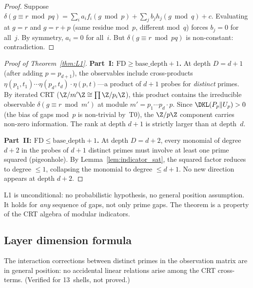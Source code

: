 \documentclass[12pt,a4paper]{article}
\begin{document}
\begin{proof}
Suppose $\delta(g \equiv r \bmod pq) = \sum_i a_i f_i(g \bmod p) + \sum_j b_j
h_j(g \bmod q) + c$.  Evaluating at $g = r$ and $g = r + p$ (same residue
mod~$p$, different mod~$q$) forces $b_j = 0$ for all~$j$.  By symmetry,
$a_i = 0$ for all~$i$.  But $\delta(g \equiv r \bmod pq)$ is non-constant:
contradiction.
\end{proof}

\begin{proof}[Proof of Theorem~\ref{thm:L1}]
\textbf{Part~I: $\mathrm{FD} \ge \mathrm{base\_depth} + 1$.}\quad
At depth $D = d{+}1$ (after adding $p = p_{d+1}$), the observables include
cross-products $\eta(p_1, t_1) \cdots \eta(p_d, t_d) \cdot \eta(p, t)$---a
product of $d{+}1$ probes for \emph{distinct} primes.  By iterated CRT
($\Z/m'\Z \cong \prod \Z/p_i\Z$), this product contains the irreducible
observable $\delta(g \equiv r \bmod m')$ at module
$m' = p_1 \cdots p_d \cdot p$.  Since $\DKL(P_p \| U_p) > 0$ (the bias of
gaps mod~$p$ is non-trivial by~T0), the $\Z/p\Z$ component carries non-zero
information.  The rank at depth $d{+}1$ is strictly larger than at depth~$d$.

\textbf{Part~II: $\mathrm{FD} \le \mathrm{base\_depth} + 1$.}\quad
At depth $D = d{+}2$, every monomial of degree $d{+}2$ in the probes of
$d{+}1$ distinct primes must involve at least one prime squared (pigeonhole).
By Lemma~\ref{lem:indicator_sat}, the squared factor reduces to degree $\le 1$,
collapsing the monomial to degree $\le d{+}1$.  No new direction appears at
depth $d{+}2$.
\end{proof}

\begin{remark}
L1 is unconditional: no probabilistic hypothesis, no general position
assumption.  It holds for \emph{any} sequence of gaps, not only prime gaps.
The theorem is a property of the CRT algebra of modular indicators.
\end{remark}


\subsection{Layer dimension formula}
\label{sec:PM_dim}

\begin{conjecture}
\label{hyp:gen_pos}
The interaction corrections between distinct primes in the observation
matrix are in general position: no accidental linear relations arise among
the CRT cross-terms.  (Verified for 13~shells, not proved.)
\end{conjecture}
\end{document}
